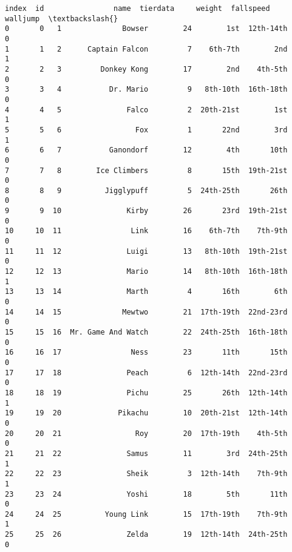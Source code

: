 \documentclass[11pt]{article}
\makeatletter
\newcommand{\boxspacing}{\kern\kvtcb@left@rule\kern\kvtcb@boxsep}
\newcommand{\prompt}[4]{
        \ttfamily\llap{{\color{#2}[#3]:\hspace{3pt}#4}}\vspace{-\baselineskip}
    }
\makeatother
\begin{document}
            \begin{tcolorbox}[breakable, size=fbox, boxrule=.5pt, pad at break*=1mm, opacityfill=0]
\prompt{Out}{outcolor}{8}{\boxspacing}
\begin{Verbatim}[commandchars=\\\{\}]
    index  id                name  tierdata     weight  fallspeed  walljump  \textbackslash{}
0       0   1              Bowser        24        1st  12th-14th         0
1       1   2      Captain Falcon         7    6th-7th        2nd         1
2       2   3         Donkey Kong        17        2nd    4th-5th         0
3       3   4           Dr. Mario         9   8th-10th  16th-18th         0
4       4   5               Falco         2  20th-21st        1st         1
5       5   6                 Fox         1       22nd        3rd         1
6       6   7           Ganondorf        12        4th       10th         0
7       7   8        Ice Climbers         8       15th  19th-21st         0
8       8   9          Jigglypuff         5  24th-25th       26th         0
9       9  10               Kirby        26       23rd  19th-21st         0
10     10  11                Link        16    6th-7th    7th-9th         0
11     11  12               Luigi        13   8th-10th  19th-21st         0
12     12  13               Mario        14   8th-10th  16th-18th         1
13     13  14               Marth         4       16th        6th         0
14     14  15              Mewtwo        21  17th-19th  22nd-23rd         0
15     15  16  Mr. Game And Watch        22  24th-25th  16th-18th         0
16     16  17                Ness        23       11th       15th         0
17     17  18               Peach         6  12th-14th  22nd-23rd         0
18     18  19               Pichu        25       26th  12th-14th         1
19     19  20             Pikachu        10  20th-21st  12th-14th         0
20     20  21                 Roy        20  17th-19th    4th-5th         0
21     21  22               Samus        11        3rd  24th-25th         1
22     22  23               Sheik         3  12th-14th    7th-9th         1
23     23  24               Yoshi        18        5th       11th         0
24     24  25          Young Link        15  17th-19th    7th-9th         1
25     25  26               Zelda        19  12th-14th  24th-25th         0


\end{Verbatim}
\end{tcolorbox}
\end{document}
